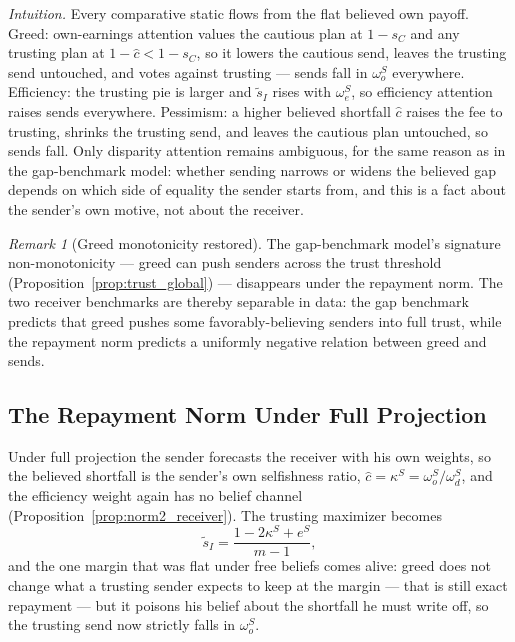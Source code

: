 \documentclass[11pt]{article}
\theoremstyle{plain}
\theoremstyle{remark}
\newtheorem{remark}{Remark}
\begin{document}
\noindent\emph{Intuition.}  Every comparative static flows from the flat believed own payoff.  Greed: own-earnings attention values the cautious plan at $1-s_C$ and any trusting plan at $1-\hat c<1-s_C$, so it lowers the cautious send, leaves the trusting send untouched, and votes against trusting --- sends fall in $\omega_o^S$ everywhere.  Efficiency: the trusting pie is larger and $\tilde s_I$ rises with $\omega_e^S$, so efficiency attention raises sends everywhere.  Pessimism: a higher believed shortfall $\hat c$ raises the fee to trusting, shrinks the trusting send, and leaves the cautious plan untouched, so sends fall.  Only disparity attention remains ambiguous, for the same reason as in the gap-benchmark model: whether sending narrows or widens the believed gap depends on which side of equality the sender starts from, and this is a fact about the sender's own motive, not about the receiver.

\begin{remark}[Greed monotonicity restored]
The gap-benchmark model's signature non-monotonicity --- greed can push senders across the trust threshold (Proposition~\ref{prop:trust_global}) --- disappears under the repayment norm.  The two receiver benchmarks are thereby separable in data: the gap benchmark predicts that greed pushes some favorably-believing senders into full trust, while the repayment norm predicts a uniformly negative relation between greed and sends.
\end{remark}

\subsection{The Repayment Norm Under Full Projection}

Under full projection the sender forecasts the receiver with his own weights, so the believed shortfall is the sender's own selfishness ratio, $\hat c=\kappa^S=\omega_o^S/\omega_d^S$, and the efficiency weight again has no belief channel (Proposition~\ref{prop:norm2_receiver}).  The trusting maximizer becomes
\[
        \tilde s_I=\frac{1-2\kappa^S+e^S}{m-1},
\]
and the one margin that was flat under free beliefs comes alive: greed does not change what a trusting sender expects to keep at the margin --- that is still exact repayment --- but it poisons his belief about the shortfall he must write off, so the trusting send now strictly falls in $\omega_o^S$.
\end{document}
